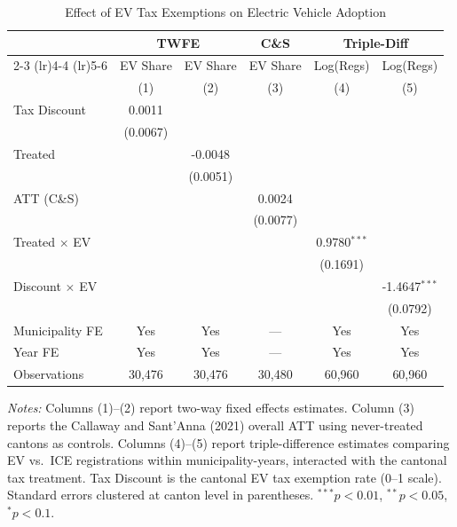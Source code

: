 \begin{table}[htbp]
\centering
\caption{Effect of EV Tax Exemptions on Electric Vehicle Adoption}
\label{tab:main}
\small
\begin{tabular}{lccccc}
\toprule
 & \multicolumn{2}{c}{TWFE} & C\&S & \multicolumn{2}{c}{Triple-Diff} \\
\cmidrule(lr){2-3} \cmidrule(lr){4-4} \cmidrule(lr){5-6}
 & EV Share & EV Share & EV Share & Log(Regs) & Log(Regs) \\
 & (1) & (2) & (3) & (4) & (5) \\
\midrule
Tax Discount & 0.0011 & & & & \\
 & (0.0067) & & & & \\
Treated & & -0.0048 & & & \\
 & & (0.0051) & & & \\
ATT (C\&S) & & & 0.0024 & & \\
 & & & (0.0077) & & \\
Treated $\times$ EV & & & & 0.9780$^{***}$ & \\
 & & & & (0.1691) & \\
Discount $\times$ EV & & & & & -1.4647$^{***}$ \\
 & & & & & (0.0792) \\
\midrule
Municipality FE & Yes & Yes & --- & Yes & Yes \\
Year FE & Yes & Yes & --- & Yes & Yes \\
Observations & 30,476 & 30,476 & 30,480 & 60,960 & 60,960 \\
\bottomrule
\end{tabular}
\begin{tablenotes}
\item \textit{Notes:} Columns (1)--(2) report two-way fixed effects estimates. Column (3) reports the Callaway and Sant'Anna (2021) overall ATT using never-treated cantons as controls. Columns (4)--(5) report triple-difference estimates comparing EV vs.\ ICE registrations within municipality-years, interacted with the cantonal tax treatment. Tax Discount is the cantonal EV tax exemption rate (0--1 scale). Standard errors clustered at canton level in parentheses. $^{***}p<0.01$, $^{**}p<0.05$, $^{*}p<0.1$.
\end{tablenotes}
\end{table}
